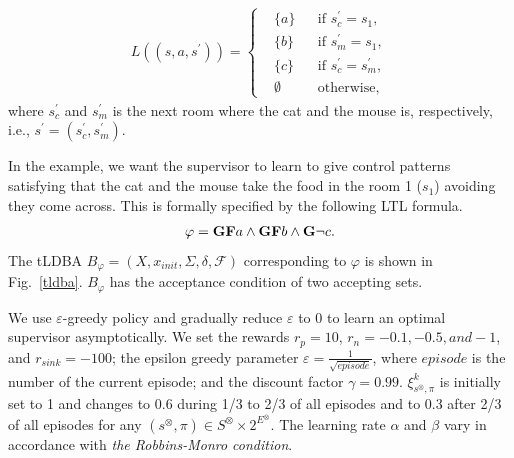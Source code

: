 \documentclass[10 pt, dvipdfmx]{article}
\theoremstyle{definition}
\begin{document}
\begin{align}
   L((s, a, s^{\prime})) =
    \left\{
    \begin{aligned}
      & \{ a \} &  & \text{if }s_c^{\prime} = s_1, \nonumber \\
      & \{ b \} &  & \text{if }s_m^{\prime} = s_1, \nonumber \\
      & \{ c \} &  & \text{if }s_c^{\prime} = s_m^{\prime}, \nonumber \\
      & \emptyset &  & \text{otherwise},
    \end{aligned}
    \right.
\end{align}
where $s_c^{\prime}$ and $s_m^{\prime}$ is the next room where the cat and the mouse is, respectively, i.e., $s^{\prime} = (s_c^{\prime},s_m^{\prime})$.

In the example, we want the supervisor to learn to give control patterns satisfying that the cat and the mouse take the food in the room 1 ($s_1$) avoiding they come across. This is formally specified by the following LTL formula.
\begin{align*}
  \varphi = \text{{\bf GF}}a \wedge \text{{\bf GF}}b \wedge \text{{\bf G}}\neg c.
\end{align*}
The tLDBA $B_{\varphi} = (X, x_{init},\Sigma,\delta,\mathcal{F})$ corresponding to $\varphi$ is shown in Fig.\ \ref{tldba}. $B_{\varphi}$ has the acceptance condition of two accepting sets.

We use $\varepsilon$-greedy policy and gradually reduce $\varepsilon$ to 0 to learn an optimal supervisor asymptotically.
We set the rewards $r_p = 10$, $r_{n} = -0.1, -0.5, and -1$, and $r_{sink} = -100$; the epsilon greedy parameter $ \varepsilon = \frac{1}{ \sqrt{episode} }$, where $episode$ is the number of the current episode; and the discount factor $\gamma = 0.99$. $\xi^k_{s^{\otimes},\pi}$ is initially set to 1 and changes to 0.6 during 1/3 to 2/3 of all episodes and to 0.3 after 2/3 of all episodes for any $(s^{\otimes},\pi) \in S^{\otimes} \times 2^{E^{\otimes}}$. The learning rate $\alpha$ and $\beta$ vary in accordance with {\it the Robbins-Monro condition}.
\end{document}
